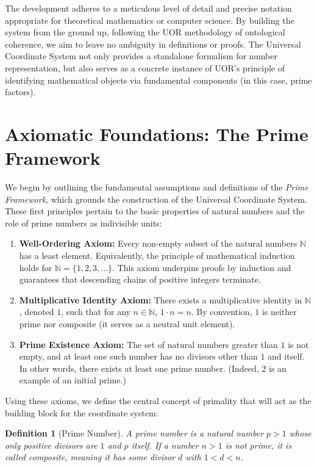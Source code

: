 \documentclass[11pt]{article}
\newtheorem{definition}{Definition}
\begin{document}
The development adheres to a meticulous level of detail and precise notation appropriate for theoretical mathematics or computer science. By building the system from the ground up, following the UOR methodology of ontological coherence, we aim to leave no ambiguity in definitions or proofs. The Universal Coordinate System not only provides a standalone formalism for number representation, but also serves as a concrete instance of UOR's principle of identifying mathematical objects via fundamental components (in this case, prime factors).

\section{Axiomatic Foundations: The Prime Framework}

We begin by outlining the fundamental assumptions and definitions of the \textit{Prime Framework}, which grounds the construction of the Universal Coordinate System. These first principles pertain to the basic properties of natural numbers and the role of prime numbers as indivisible units:

\begin{enumerate}[label={\bf Axiom \arabic*:}, leftmargin=3em]
 \item \textbf{Well-Ordering Axiom:} Every non-empty subset of the natural numbers $\mathbb{N}$ has a least element. Equivalently, the principle of mathematical induction holds for $\mathbb{N} = \{1,2,3,\dots\}$. This axiom underpins proofs by induction and guarantees that descending chains of positive integers terminate.
 \item \textbf{Multiplicative Identity Axiom:} There exists a multiplicative identity in $\mathbb{N}$, denoted $1$, such that for any $n \in \mathbb{N}$, $1 \cdot n = n$. By convention, $1$ is neither prime nor composite (it serves as a neutral unit element).
 \item \textbf{Prime Existence Axiom:} The set of natural numbers greater than $1$ is not empty, and at least one such number has no divisors other than $1$ and itself. In other words, there exists at least one prime number. (Indeed, $2$ is an example of an initial prime.)
\end{enumerate}

Using these axioms, we define the central concept of primality that will act as the building block for the coordinate system:

\begin{definition}[Prime Number]\label{def:prime}
A \emph{prime number} is a natural number $p > 1$ whose only positive divisors are $1$ and $p$ itself. If a number $n > 1$ is not prime, it is called \emph{composite}, meaning it has some divisor $d$ with $1 < d < n$. 
\end{definition}
\end{document}

